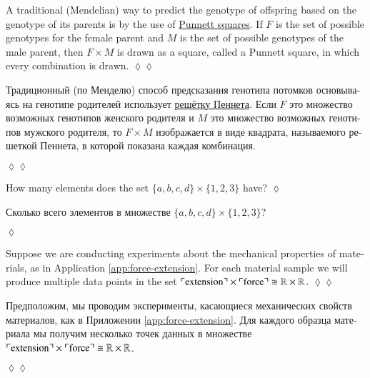 \documentclass[a4paper]{book}
\def\tn{\textnormal}
\def\RR{{\mathbb R}}
\def\iso{\cong}
\newcommand{\fakebox}[1]{\tn{$\ulcorner$#1$\urcorner$}}
\theoremstyle{myth}
\newtheorem{excENG}[envENG]{\begin{english}Exercise\end{english}}
\newtheorem{appENG}[envENG]{\begin{english}Application\end{english}}
\newenvironment{exerciseENG}{\begin{excENG}}{\hspace*{\fill}$\lozenge$\end{excENG}}
\newenvironment{applicationENG}{\begin{appENG}}{\hspace*{\fill}$\lozenge\lozenge$\end{appENG}}
\newtheorem{excRUS}[envRUS]{\begin{russian}Упражнение\end{russian}}
\newtheorem{appRUS}[envRUS]{\begin{russian}Прикладной пример (применение)\end{russian}}
\newenvironment{exerciseRUS}{\begin{excRUS}}{\hspace*{\fill}$\lozenge$\end{excRUS}}
\newenvironment{applicationRUS}{\begin{appRUS}}{\hspace*{\fill}$\lozenge\lozenge$\end{appRUS}}
\begin{document}
\begin{english}
\begin{applicationENG}
A traditional (Mendelian) way to predict the genotype of offspring based on the genotype of its parents is by the use of \href{http://en.wikipedia.org/wiki/Punnett_square}{Punnett squares}. If $F$ is the set of possible genotypes for the female parent and $M$ is the set of possible genotypes of the male parent, then $F\times M$ is drawn as a square, called a Punnett square, in which every combination is drawn. 
\end{applicationENG}

\begin{applicationRUS}
\begin{russian}Традиционный (по Менделю) способ предсказания генотипа потомков основываясь на генотипе родителей использует \href{https://ru.wikipedia.org/wiki/%D0%A0%D0%B5%D1%88%D1%91%D1%82%D0%BA%D0%B0_%D0%9F%D0%B5%D0%BD%D0%BD%D0%B5%D1%82%D0%B0}{решётку Пеннета}. Если $F$ это множество возможных генотипов женского родителя и $M$ это множество возможных генотипов мужского родителя, то $F\times M$ изображается в виде квадрата, называемого решеткой Пеннета, в которой показана каждая комбинация. \end{russian}
\end{applicationRUS}

\begin{exerciseENG}
How many elements does the set $\{a,b,c,d\}\times\{1,2,3\}$ have?
\end{exerciseENG}

\begin{exerciseRUS}
\begin{russian}Сколько всего элементов в множестве $\{a,b,c,d\}\times\{1,2,3\}$?\end{russian}
\end{exerciseRUS}

\begin{applicationENG}
Suppose we are conducting experiments about the mechanical properties of materials, as in Application \ref{app:force-extension}. For each material sample we will produce multiple data points in the set $\fakebox{extension}\times\fakebox{force}\iso\RR\times\RR$.
\end{applicationENG}

\begin{applicationRUS}
\begin{russian}Предположим, мы проводим эксперименты, касающиеся механических свойств материалов, как в Приложении \ref{app:force-extension}. Для каждого образца материала мы получим несколько точек данных в множестве $\fakebox{extension}\times\fakebox{force}\iso\RR\times\RR$.\end{russian}
\end{applicationRUS}


\end{english}
\end{document}
